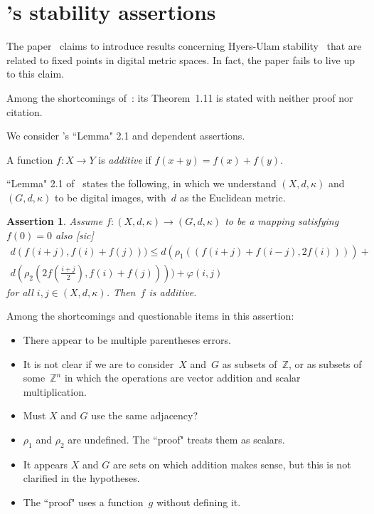 \documentclass{article}
\newtheorem{assert}[thm]{Assertion}
\numberwithin{thm}{section}
\def\Z{{\mathbb Z}}
\begin{document}
\section{\cite{NawazEtal}'s stability
assertions}
The paper~\cite{NawazEtal} claims to
introduce results concerning Hyers-Ulam 
stability~\cite{NawazEtal,Ulam} 
that are related to fixed points 
in digital metric spaces. In fact, the
paper fails to live up to this claim.

Among the shortcomings of~\cite{NawazEtal}:
its Theorem~1.11 is stated with
neither proof nor citation.

We consider \cite{NawazEtal}'s ``Lemma" 2.1 and dependent assertions.

A function $f: X \to Y$ is 
{\em additive} if 
$f(x+y) = f(x) + f(y)$.

``Lemma" 2.1 of~\cite{NawazEtal} states
the following, in which we understand
$(X,d,\kappa)$ and $(G,d,\kappa)$ to
be digital images, with~$d$ as the
Euclidean metric.

\begin{assert}
    \label{Nawaz2.1}
    Assume $f: (X,d,\kappa) \to (G,d,\kappa)$ to be a mapping
    satisfying $f(0)=0$ also {\rm [{\em sic}]}
    \begin{equation}
        \label{Nawaz2.1ineq}
        \begin{array}{c}
        d(f(i+j), f(i) + f(j))) \le %
        d(\rho_1((f(i+j) + f(i-j),2f(i)))) + \\
        d(\rho_2 (2f(\frac{i+j}{2}),
        f(i)+f(j)))) + \varphi(i,j)
        \end{array}
    \end{equation}
    for all $i,j \in (X,d,\kappa)$.
    Then~$f$ is additive.
\end{assert}

Among the shortcomings and questionable
items in this assertion:
\begin{itemize}
    \item There appear to be multiple
    parentheses errors.
    \item It is not clear if we are to
    consider~$X$ and~$G$ as subsets
    of~$\Z$, or as subsets of 
    some~$\Z^n$ in which the 
    operations are vector addition and
    scalar multiplication.
    \item Must $X$ and $G$ use the
          same adjacency?
    \item $\rho_1$ and $\rho_2$ are
          undefined. The ``proof"
          treats them as scalars.
    \item It appears $X$ and $G$ are
        sets on which addition makes
        sense, but this is not clarified
        in the hypotheses.
    \item The ``proof" uses a
    function~$g$ without defining it.
\end{itemize}
\end{document}
